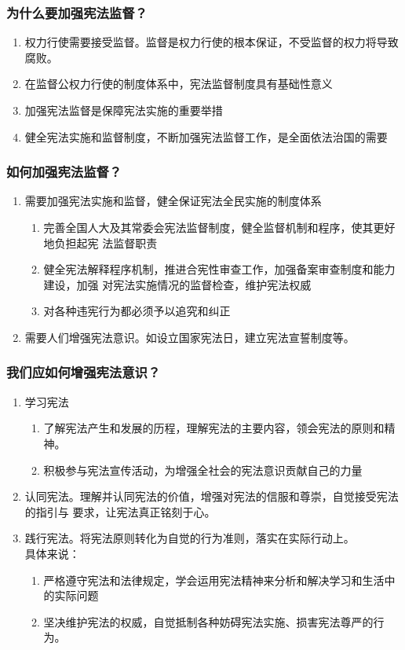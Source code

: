 \documentclass[11pt]{article}
\begin{document}
\subsubsection{为什么要加强宪法监督？}
\label{sec:org9332999}
\begin{enumerate}
\item 权力行使需要接受监督。监督是权力行使的根本保证，不受监督的权力将导致腐败。
\item 在监督公权力行使的制度体系中，宪法监督制度具有基础性意义
\item 加强宪法监督是保障宪法实施的重要举措
\item 健全宪法实施和监督制度，不断加强宪法监督工作，是全面依法治国的需要
\end{enumerate}
\subsubsection{如何加强宪法监督？}
\label{sec:org5e3c5c9}
\begin{enumerate}
\item 需要加强宪法实施和监督，健全保证宪法全民实施的制度体系
\begin{enumerate}
\item 完善全国人大及其常委会宪法监督制度，健全监督机制和程序，使其更好地负担起宪
法监督职责
\item 健全宪法解释程序机制，推进合宪性审查工作，加强备案审查制度和能力建设，加强
对宪法实施情况的监督检查，维护宪法权威
\item 对各种违宪行为都必须予以追究和纠正
\end{enumerate}
\item 需要人们增强宪法意识。如设立国家宪法日，建立宪法宣誓制度等。
\end{enumerate}
\subsubsection{我们应如何增强宪法意识？}
\label{sec:org642b5ce}
\begin{enumerate}
\item 学习宪法
\begin{enumerate}
\item 了解宪法产生和发展的历程，理解宪法的主要内容，领会宪法的原则和精神。
\item 积极参与宪法宣传活动，为增强全社会的宪法意识贡献自己的力量
\end{enumerate}
\item 认同宪法。理解并认同宪法的价值，增强对宪法的信服和尊崇，自觉接受宪法的指引与
要求，让宪法真正铭刻于心。
\item 践行宪法。将宪法原则转化为自觉的行为准则，落实在实际行动上。\\
具体来说：
\begin{enumerate}
\item 严格遵守宪法和法律规定，学会运用宪法精神来分析和解决学习和生活中的实际问题
\item 坚决维护宪法的权威，自觉抵制各种妨碍宪法实施、损害宪法尊严的行为。
\end{enumerate}
\end{enumerate}
\end{document}

